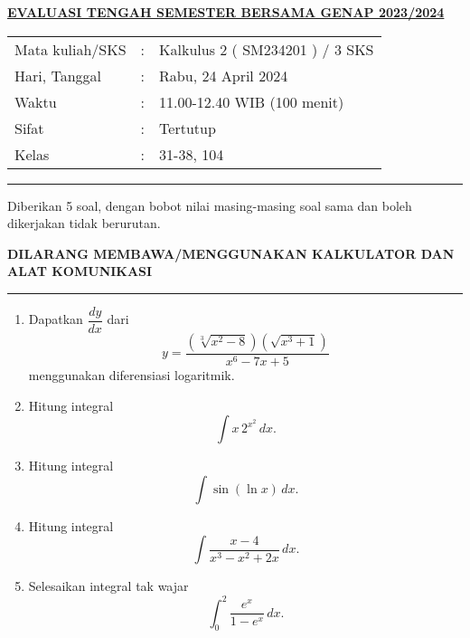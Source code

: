 \documentclass[11pt,openany,a4paper]{article}
\begin{document}
    \newpage
    \pagestyle{problems}
    
    \begin{center}
	{\underline{\textbf{\MakeUppercase{Evaluasi Tengah Semester Bersama Genap 2023/2024}}}}
    \end{center}

    \begin{center}
	\begin{tabular}{lcl}
		Mata kuliah/SKS & : & Kalkulus 2 ( SM234201 ) / 3 SKS\\
		Hari, Tanggal & : & Rabu, 24 April 2024\\
		Waktu & : & 11.00-12.40 WIB (100 menit)\\
		Sifat & : & Tertutup\\
		Kelas & : & 31-38, 104
	\end{tabular}
    \end{center}
	
    \noindent\rule{\textwidth}{2.pt}
	
    \setlength{\parindent}{5pt}
    \par Diberikan 5 soal, dengan bobot nilai masing-masing soal sama dan boleh dikerjakan tidak berurutan.
    \setlength{\parindent}{5pt}
    \setlength{\parindent}{5pt}
    {\small
    \par \textbf{\MakeUppercase{Dilarang membawa/menggunakan kalkulator dan alat komunikasi}}
    }
    \par {}
	
    \noindent\rule{\textwidth}{2.pt}
	
\begin{enumerate}
  \item Dapatkan \( \dfrac{dy}{dx} \) dari 
  \[
  y = \frac{\left(\sqrt[3]{x^2 - 8}\right)\left(\sqrt{x^3 + 1}\right)}{x^6 - 7x + 5}
  \]
  menggunakan diferensiasi logaritmik.
  
  \item Hitung integral
  \[
  \int x \, 2^{x^2} \, dx.
  \]
  
  \item Hitung integral
  \[
  \int \sin(\ln x) \, dx.
  \]
  
  \item Hitung integral
  \[
  \int \frac{x - 4}{x^3 - x^2 + 2x} \, dx.
  \]
  
  \item Selesaikan integral tak wajar
  \[
  \int_0^2 \frac{e^x}{1 - e^x} \, dx.
  \]
\end{enumerate}
	
\end{document}
